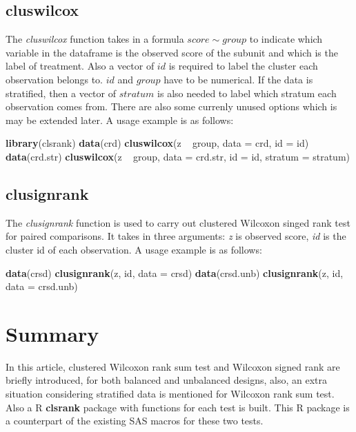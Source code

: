 \documentclass[12pt]{article}
\newenvironment{Shaded}{\begin{snugshade}}{\end{snugshade}}
\newcommand{\KeywordTok}[1]{\textcolor[rgb]{0.13,0.29,0.53}{\textbf{{#1}}}}
\newcommand{\DataTypeTok}[1]{\textcolor[rgb]{0.13,0.29,0.53}{{#1}}}
\newcommand{\StringTok}[1]{\textcolor[rgb]{0.31,0.60,0.02}{{#1}}}
\newcommand{\NormalTok}[1]{{#1}}
\begin{document}
\subsection{cluswilcox}\label{cluswilcox}

The \emph{cluswilcox} function takes in a formula \(score \sim group\)
to indicate which variable in the dataframe is the observed score of the
subunit and which is the label of treatment. Also a vector of \(id\) is
required to label the cluster each observation belongs to. \(id\) and
\(group\) have to be numerical. If the data is stratified, then a vector
of \(stratum\) is also needed to label which stratum each observation
comes from. There are also some currenly unused options which is may be
extended later. A usage example is as follows:

\begin{Shaded}
\begin{Highlighting}[]
\KeywordTok{library}\NormalTok{(clsrank)}
\KeywordTok{data}\NormalTok{(crd)}
\KeywordTok{cluswilcox}\NormalTok{(z ~}\StringTok{ }\NormalTok{group, }\DataTypeTok{data =} \NormalTok{crd, }\DataTypeTok{id =} \NormalTok{id)}
\KeywordTok{data}\NormalTok{(crd.str)}
\KeywordTok{cluswilcox}\NormalTok{(z ~}\StringTok{ }\NormalTok{group, }\DataTypeTok{data =} \NormalTok{crd.str, }\DataTypeTok{id =} \NormalTok{id, }\DataTypeTok{stratum =} \NormalTok{stratum)}
\end{Highlighting}
\end{Shaded}

\subsection{clusignrank}\label{clusignrank}

The \emph{clusignrank} function is used to carry out clustered Wilcoxon
singed rank test for paired comparisons. It takes in three arguments:
\emph{z} is observed score, \emph{id} is the cluster id of each
observation. A usage example is as follows:

\begin{Shaded}
\begin{Highlighting}[]
\KeywordTok{data}\NormalTok{(crsd)}
\KeywordTok{clusignrank}\NormalTok{(z, id, }\DataTypeTok{data =} \NormalTok{crsd)}
\KeywordTok{data}\NormalTok{(crsd.unb)}
\KeywordTok{clusignrank}\NormalTok{(z, id, }\DataTypeTok{data =} \NormalTok{crsd.unb)}
\end{Highlighting}
\end{Shaded}

\section{Summary}
In this article, clustered Wilcoxon rank sum test and Wilcoxon signed rank are briefly introduced, for both balanced and unbalanced designs, also, an extra situation considering stratified data is mentioned for Wilcoxon rank sum test. Also a R \textbf{clsrank} package with functions for each test is built. This R package is a counterpart of the existing SAS macros for these two tests. 





\end{document}
